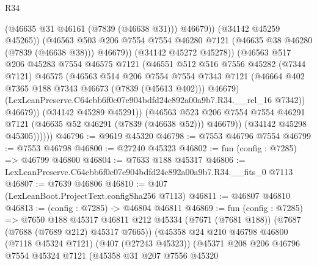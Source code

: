 \begin{lexlean}{R34}
\begin{coremodule}
                              (@46635 @31 @46161 (@7839 (@46638 @31)))
                              @46679))
                          (@34142 @45259 @45265))
                        (@46563
                          @503
                          @206
                          @7554
                          @7554
                          @46280
                          @7121
                          (@46635 @38 @46280 (@7839 (@46638 @38)))
                          @46679))
                      (@34142 @45272 @45278))
                    (@46563
                      @517
                      @206
                      @45283
                      @7554
                      @46575
                      @7121
                      (@46551
                        @512
                        @516
                        @7556
                        @45282
                        (@7344 @7121)
                        @46575
                        (@46563
                          @514
                          @206
                          @7554
                          @7554
                          @7343
                          @7121
                          (@46664 @402 @7365 @188 @7343 @46673 (@7839 (@45613 @402)))
                          @46679)
                        (LexLeanPreserve.C64ebb6f0c07e904bdfd24c892a00a9b7.R34.__rel_16 @7342))
                      @46679))
                  (@34142 @45289 @45291))
                (@46563
                  @523
                  @206
                  @7554
                  @7554
                  @46291
                  @7121
                  (@46635 @52 @46291 (@7839 (@46638 @52)))
                  @46679))
              (@34142 @45298 @45305))))))
@46796 := @9619 @45320
@46798 := @7553 @46796 @7554
@46799 := @7553 @46798
@46800 := @27240 @45323
@46802 := fun (config : @7285) => @46799 @46800
@46804 := @7633 @188 @45317
@46806 := LexLeanPreserve.C64ebb6f0c07e904bdfd24c892a00a9b7.R34.__fits_0 @7113
@46807 := @7639 @46806
@46810 := @407 (LexLeanBoot.ProjectText.configSha256 @7113)
@46811 := @46807 @46810
@46813 := (config : @7285) -> @46804 @46811
@46869 := fun (config : @7285) =>
  @7650
    @188
    @45317
    @46811
    @212
    @45334
    (@7671 (@7681 @188))
    (@7687 (@7688 (@7689 @212) @45317 @7665))
    (@45358
      @24
      @210
      @46798
      @46800
      (@7118 @45324 @7121)
      (@407 (@27243 @45323))
      (@45371
        @208
        @206
        @46796
        @7554
        @45324
        @7121
        (@45358
          @31
          @207
          @7556
          @45320

\end{coremodule}
\end{lexlean}
